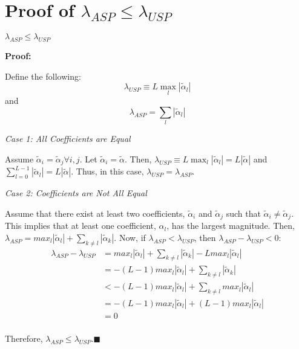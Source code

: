 \section{Proof of $\lambda_{ASP} \leq \lambda_{USP}$}
\label{sec:proof-of-rescaling-factors}

\begin{theorem}
    $\lambda_{ASP} \leq \lambda_{USP}$
\end{theorem}

\textbf{Proof:} 

Define the following:
\begin{equation}
    \lambda_{USP} \equiv L\max_l|\tilde{\alpha}_l|
\end{equation}
and
\begin{equation}
    \lambda_{ASP} = \sum_l |\tilde{\alpha}_l|
\end{equation}

\textit{Case 1: All Coefficients are Equal}

Assume $\tilde{\alpha}_i = \tilde{\alpha}_j \forall i,j$.
Let $\tilde{\alpha}_i = \tilde{\alpha}$.
Then, $\lambda_{USP} \equiv L\max_l|\tilde{\alpha}_l| = L|\tilde{\alpha}|$ and $\sum_{l = 0}^{L - 1}|\tilde{\alpha}_l| = L|\tilde{\alpha}|$.
Thus, in this case, $\lambda_{USP} = \lambda_{ASP}$.

\textit{Case 2: Coefficients are Not All Equal}

Assume that there exist at least two coefficients, $\tilde{\alpha}_i$ and $\tilde{\alpha}_j$ such that $\tilde{\alpha}_i \neq \tilde{\alpha}_j$.
This implies that at least one coefficient, $\alpha_l$, has the largest magnitude.
Then, $\lambda_{ASP} = max_l|\tilde{\alpha}_l| + \sum_{k \neq l}|\tilde{\alpha}_k|$.
Now, if $\lambda_{ASP} < \lambda_{USP}$, then $\lambda_{ASP} - \lambda_{USP} < 0$:
\begin{align}
    \lambda_{ASP} - \lambda_{USP} &= max_l|\tilde{\alpha}_l| + \sum_{k \neq l}|\tilde{\alpha}_k| - Lmax_l|\tilde{\alpha}_l|\\ \nonumber
                                &= -(L - 1)max_l|\tilde{\alpha}_l|+ \sum_{k \neq l}|\tilde{\alpha}_k| \\ \nonumber
                                &< -(L - 1)max_l|\tilde{\alpha}_l| + \sum_{k \neq l}max_l|\tilde{\alpha}_l| \\ \nonumber
                                &= -(L - 1)max_l|\tilde{\alpha}_l| + (L - 1) max_l|\tilde{\alpha}_l|\\ \nonumber
                                &= 0 \\ \nonumber
\end{align}

Therefore, $\lambda_{ASP} \leq \lambda_{USP}$.$\blacksquare$
